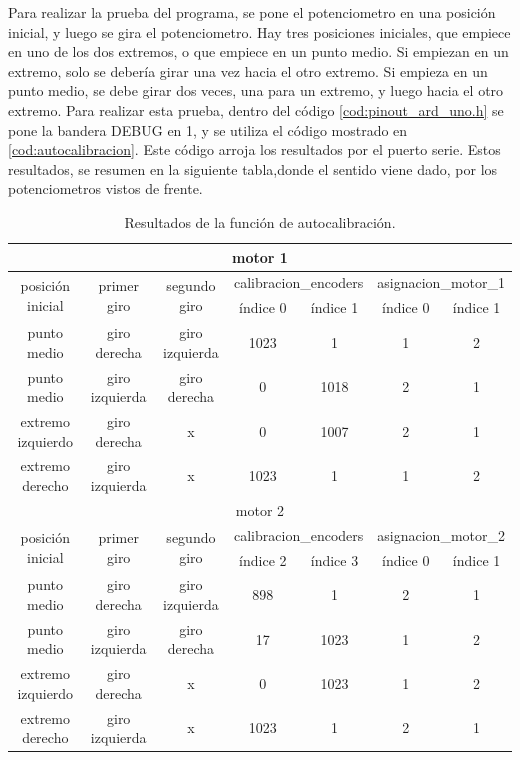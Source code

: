 Para realizar la prueba del programa, se pone el potenciometro en una posición inicial, y luego se gira el potenciometro. Hay tres posiciones iniciales, que empiece en uno de los dos extremos, o que empiece en un punto medio. Si empiezan en un extremo, solo se debería girar una vez hacia el otro extremo. Si empieza en un punto medio, se debe girar dos veces, una para un extremo, y luego hacia el otro extremo. Para realizar esta prueba, dentro del código \ref{cod:pinout_ard_uno.h} se pone la bandera DEBUG en 1, y se utiliza el código mostrado en \ref{cod:autocalibracion}. Este código arroja los resultados por el puerto serie. Estos resultados, se resumen en la siguiente tabla,donde el sentido viene dado, por los potenciometros vistos de frente.   

\renewcommand{\arraystretch}{1.5} 
\begin{table}[ht]
	\begin{tabular}{|c|c|c|c|c|c|c|}
		\hline 
		\multicolumn{7}{|c|}{motor 1} \\
		\hline 
		\multirow{2}{*}{posición inicial} & 
		\multirow{2}{*}{primer giro} &\multirow{2}{*}{segundo giro} & \multicolumn{2}{l|}{calibracion\_encoders}& \multicolumn{2}{l|}{asignacion\_motor\_1} \\ \cline{4-7} 
		   & & & índice 0 &índice 1 &índice 0 &  índice 1 \\
		 \hline 
	      punto medio & giro derecha & giro izquierda & 1023 & 1 & 1 & 2 \\
	     \hline 
		 punto medio & giro izquierda & giro derecha & 0 & 1018 & 2 & 1 \\
		 \hline 	
		extremo izquierdo & giro derecha & x & 0 & 1007 & 2 & 1 \\
		\hline 
	    extremo derecho & giro izquierda & x & 1023 & 1 & 1 & 2 \\
		\hline 	
		\hline
		
		\multicolumn{7}{|c|}{motor 2} \\
		\hline 
		
		\multirow{2}{*}{posición inicial} & 
		\multirow{2}{*}{primer giro} &\multirow{2}{*}{segundo giro} & \multicolumn{2}{l|}{calibracion\_encoders}& \multicolumn{2}{l|}{asignacion\_motor\_2} \\ \cline{4-7} 
		   & & & índice 2 &índice 3 &índice 0 &  índice 1 \\ 
		\hline 
		 punto medio & giro derecha & giro izquierda & 898 & 1 & 2 & 1  \\
		\hline 
		 punto medio & giro izquierda & giro derecha & 17 & 1023 & 1 &2  \\
		\hline 	
		 extremo izquierdo & giro derecha & x & 0 & 1023 & 1 &2  \\
		\hline 
		 extremo derecho & giro izquierda & x & 1023 & 1 & 2 & 1 \\
		\hline
		\end{tabular}
	\caption{Resultados de la función de autocalibración.}
	\label{tab:resultados_autocalibracion}
\end{table}


